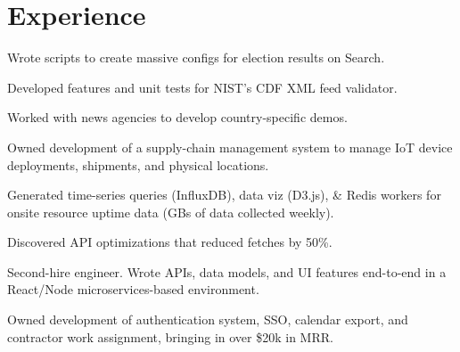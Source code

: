 \documentclass[]{deedy-resume-openfont}
\begin{document}
\hfill
\begin{minipage}[t]{0.66\textwidth}


\section{Experience}
\sectionsep

\vspace{\topsep}
\begin{tightemize}

\item Wrote scripts to create massive configs for election results on Search.
\item Developed features and unit tests for NIST's CDF XML feed validator.
\item Worked with news agencies to develop country-specific demos.

\end{tightemize}
\sectionsep

\begin{tightemize}

\item Owned development of a supply-chain management system to manage IoT device deployments, shipments, and physical locations.
\item Generated time-series queries (InfluxDB), data viz (D3.js), \& Redis workers for onsite resource uptime data (GBs of data collected weekly).
\item Discovered API optimizations that reduced fetches by 50\%.

\end{tightemize}
\sectionsep


\begin{tightemize}

\item Second-hire engineer. Wrote APIs, data models, and UI features end-to-end in a React/Node microservices-based environment.
\item Owned development of authentication system, SSO, calendar export, and contractor work assignment, bringing in over \$20k in MRR.


\end{tightemize}
\end{minipage}
\end{document}
